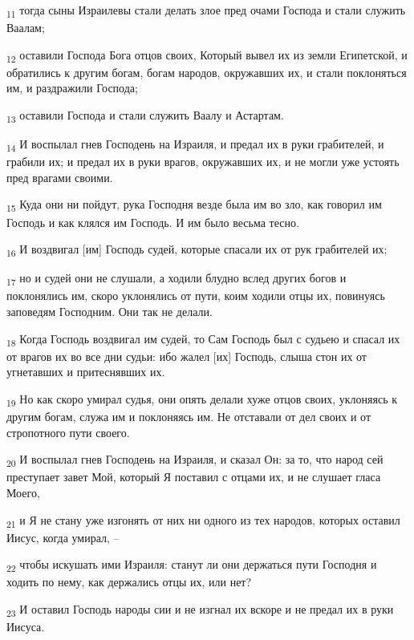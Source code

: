 \begin{tcolorbox}
\textsubscript{11} тогда сыны Израилевы стали делать злое пред очами Господа и стали служить Ваалам;
\end{tcolorbox}
\begin{tcolorbox}
\textsubscript{12} оставили Господа Бога отцов своих, Который вывел их из земли Египетской, и обратились к другим богам, богам народов, окружавших их, и стали поклоняться им, и раздражили Господа;
\end{tcolorbox}
\begin{tcolorbox}
\textsubscript{13} оставили Господа и стали служить Ваалу и Астартам.
\end{tcolorbox}
\begin{tcolorbox}
\textsubscript{14} И воспылал гнев Господень на Израиля, и предал их в руки грабителей, и грабили их; и предал их в руки врагов, окружавших их, и не могли уже устоять пред врагами своими.
\end{tcolorbox}
\begin{tcolorbox}
\textsubscript{15} Куда они ни пойдут, рука Господня везде была им во зло, как говорил им Господь и как клялся им Господь. И им было весьма тесно.
\end{tcolorbox}
\begin{tcolorbox}
\textsubscript{16} И воздвигал [им] Господь судей, которые спасали их от рук грабителей их;
\end{tcolorbox}
\begin{tcolorbox}
\textsubscript{17} но и судей они не слушали, а ходили блудно вслед других богов и поклонялись им, скоро уклонялись от пути, коим ходили отцы их, повинуясь заповедям Господним. Они так не делали.
\end{tcolorbox}
\begin{tcolorbox}
\textsubscript{18} Когда Господь воздвигал им судей, то Сам Господь был с судьею и спасал их от врагов их во все дни судьи: ибо жалел [их] Господь, слыша стон их от угнетавших и притеснявших их.
\end{tcolorbox}
\begin{tcolorbox}
\textsubscript{19} Но как скоро умирал судья, они опять делали хуже отцов своих, уклоняясь к другим богам, служа им и поклоняясь им. Не отставали от дел своих и от стропотного пути своего.
\end{tcolorbox}
\begin{tcolorbox}
\textsubscript{20} И воспылал гнев Господень на Израиля, и сказал Он: за то, что народ сей преступает завет Мой, который Я поставил с отцами их, и не слушает гласа Моего,
\end{tcolorbox}
\begin{tcolorbox}
\textsubscript{21} и Я не стану уже изгонять от них ни одного из тех народов, которых оставил Иисус, когда умирал, --
\end{tcolorbox}
\begin{tcolorbox}
\textsubscript{22} чтобы искушать ими Израиля: станут ли они держаться пути Господня и ходить по нему, как держались отцы их, или нет?
\end{tcolorbox}
\begin{tcolorbox}
\textsubscript{23} И оставил Господь народы сии и не изгнал их вскоре и не предал их в руки Иисуса.
\end{tcolorbox}
